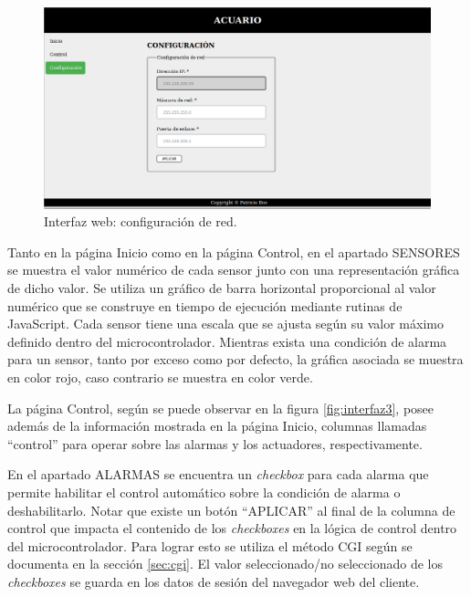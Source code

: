 \begin{figure}[htp]
	\centering
    \includegraphics[width=\textwidth]{./Figures/interfaz_config}
	\caption{Interfaz web: configuración de red.}
	\label{fig:interfazConfig}
\end{figure}

Tanto en la página Inicio como en la página Control, en el apartado SENSORES se muestra el valor numérico de cada sensor junto con una representación gráfica de dicho valor.  Se utiliza un gráfico de barra horizontal proporcional al valor numérico que se construye en tiempo de ejecución mediante rutinas de JavaScript.  Cada sensor tiene una escala que se ajusta según su valor máximo definido dentro del microcontrolador.  Mientras exista una condición de alarma para un sensor, tanto por exceso como por defecto, la gráfica asociada se muestra en color rojo, caso contrario se muestra en color verde.

La página Control, según se puede observar en la figura \ref{fig:interfaz3}, posee además de la información mostrada en la página Inicio, columnas llamadas ``control'' para operar sobre las alarmas y los actuadores, respectivamente.  

En el apartado ALARMAS se encuentra un \textit{checkbox} para cada alarma que permite habilitar el control automático sobre la condición de alarma o deshabilitarlo.  Notar que existe un botón ``APLICAR'' al final de la columna de control que impacta el contenido de los \textit{checkboxes} en la lógica de control dentro del microcontrolador. Para lograr esto se utiliza el método CGI según se documenta en la sección \ref{sec:cgi}.  El valor seleccionado/no seleccionado de los \textit{checkboxes} se guarda en los datos de sesión del navegador web del cliente.

\vspace{30px}


